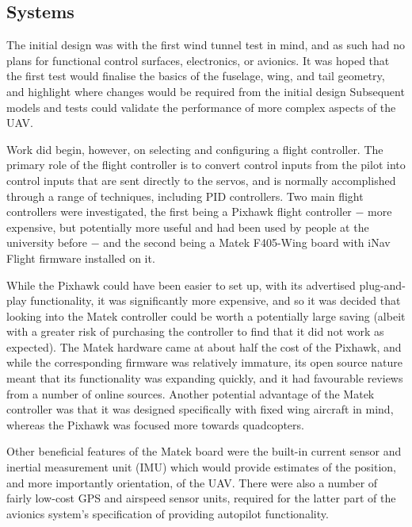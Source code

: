 \documentclass[../../main.tex]{subfiles}
\begin{document}
\subsection{Systems} \label{sec:design-process:preliminary-design:systems}

The initial design was with the first wind tunnel test in mind, and as such had no plans for functional control surfaces, electronics, or avionics.
It was hoped that the first test would finalise the basics of the fuselage, wing, and tail geometry, and highlight where changes would be required from the initial design
Subsequent models and tests could validate the performance of more complex aspects of the UAV. 

Work did begin, however, on selecting and configuring a flight controller.
The primary role of the flight controller is to convert control inputs from the pilot into control inputs that are sent directly to the servos, and is normally accomplished through a range of techniques, including PID controllers.
Two main flight controllers were investigated, the first being a Pixhawk flight controller $-$ more expensive, but potentially more useful and had been used by people at the university before $-$ and the second being a Matek F405-Wing board with iNav Flight firmware installed on it. 

While the Pixhawk could have been easier to set up, with its advertised plug-and-play functionality, it was significantly more expensive, and so it was decided that looking into the Matek controller could be worth a potentially large saving (albeit with a greater risk of purchasing the controller to find that it did not work as expected).
The Matek hardware came at about half the cost of the Pixhawk, and while the corresponding firmware was relatively immature, its open source nature meant that its functionality was expanding quickly, and it had favourable reviews from a number of online sources.
Another potential advantage of the Matek controller was that it was designed specifically with fixed wing aircraft in mind, whereas the Pixhawk was focused more towards quadcopters. 


Other beneficial features of the Matek board were the built-in current sensor and inertial measurement unit (IMU) which would provide estimates of the position, and more importantly orientation, of the UAV.
There were also a number of fairly low-cost GPS and airspeed sensor units, required for the latter part of the avionics system's specification of providing autopilot functionality. 
\end{document}
